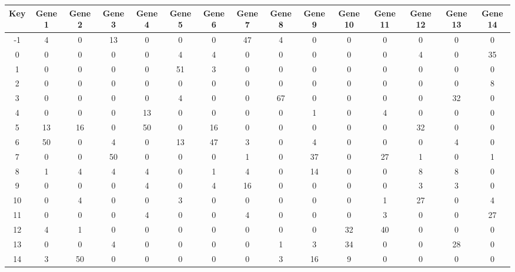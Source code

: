 \begin{tabular}{|c|c|c|c|c|c|c|c|c|c|c|c|c|c|c|}
\hline
Key & Gene 1 & Gene 2 & Gene 3 & Gene 4 & Gene 5 & Gene 6 & Gene 7 & Gene 8 & Gene 9 & Gene 10 & Gene 11 & Gene 12 & Gene 13 & Gene 14 \\
\hline
-1 & 4 & 0 & 13 & 0 & 0 & 0 & 47 & 4 & 0 & 0 & 0 & 0 & 0 & 0 \\
0 & 0 & 0 & 0 & 0 & 4 & 4 & 0 & 0 & 0 & 0 & 0 & 4 & 0 & 35 \\
1 & 0 & 0 & 0 & 0 & 51 & 3 & 0 & 0 & 0 & 0 & 0 & 0 & 0 & 0 \\
2 & 0 & 0 & 0 & 0 & 0 & 0 & 0 & 0 & 0 & 0 & 0 & 0 & 0 & 8 \\
3 & 0 & 0 & 0 & 0 & 4 & 0 & 0 & 67 & 0 & 0 & 0 & 0 & 32 & 0 \\
4 & 0 & 0 & 0 & 13 & 0 & 0 & 0 & 0 & 1 & 0 & 4 & 0 & 0 & 0 \\
5 & 13 & 16 & 0 & 50 & 0 & 16 & 0 & 0 & 0 & 0 & 0 & 32 & 0 & 0 \\
6 & 50 & 0 & 4 & 0 & 13 & 47 & 3 & 0 & 4 & 0 & 0 & 0 & 4 & 0 \\
7 & 0 & 0 & 50 & 0 & 0 & 0 & 1 & 0 & 37 & 0 & 27 & 1 & 0 & 1 \\
8 & 1 & 4 & 4 & 4 & 0 & 1 & 4 & 0 & 14 & 0 & 0 & 8 & 8 & 0 \\
9 & 0 & 0 & 0 & 4 & 0 & 4 & 16 & 0 & 0 & 0 & 0 & 3 & 3 & 0 \\
10 & 0 & 4 & 0 & 0 & 3 & 0 & 0 & 0 & 0 & 0 & 1 & 27 & 0 & 4 \\
11 & 0 & 0 & 0 & 4 & 0 & 0 & 4 & 0 & 0 & 0 & 3 & 0 & 0 & 27 \\
12 & 4 & 1 & 0 & 0 & 0 & 0 & 0 & 0 & 0 & 32 & 40 & 0 & 0 & 0 \\
13 & 0 & 0 & 4 & 0 & 0 & 0 & 0 & 1 & 3 & 34 & 0 & 0 & 28 & 0 \\
14 & 3 & 50 & 0 & 0 & 0 & 0 & 0 & 3 & 16 & 9 & 0 & 0 & 0 & 0 \\
\hline
\end{tabular}